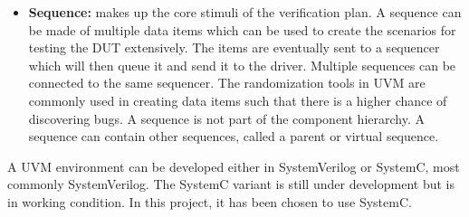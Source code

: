 \begin{itemize}
\begin{itemize}
    \end{itemize}
    \item \textbf{Sequence:} makes up the core stimuli of the verification plan. A sequence can be made of multiple data items which can be used to create the scenarios for testing the DUT extensively. The items are eventually sent to a sequencer which will then queue it and send it to the driver. Multiple sequences can be connected to the same sequencer. The randomization tools in UVM are commonly used in creating data items such that there is a higher chance of discovering bugs. A sequence is not part of the component hierarchy. A sequence can contain other sequences, called a parent or virtual sequence.  
\end{itemize}

A UVM environment can be developed either in SystemVerilog or SystemC, most commonly SystemVerilog. The SystemC variant is still under development but is in working condition. In this project, it has been chosen to use SystemC.
